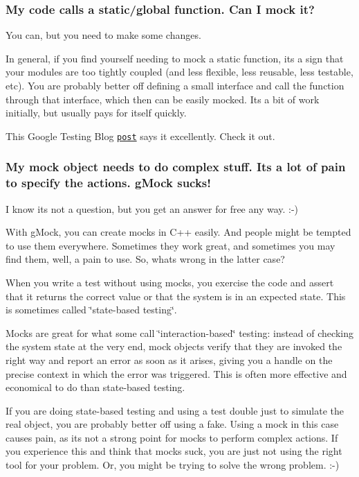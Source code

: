 \subsubsection*{My code calls a static/global function. Can I mock it?}

You can, but you need to make some changes.

In general, if you find yourself needing to mock a static function, it\textquotesingle{}s a sign that your modules are too tightly coupled (and less flexible, less reusable, less testable, etc). You are probably better off defining a small interface and call the function through that interface, which then can be easily mocked. It\textquotesingle{}s a bit of work initially, but usually pays for itself quickly.

This Google Testing Blog \href{https://testing.googleblog.com/2008/06/defeat-static-cling.html}{\tt post} says it excellently. Check it out.

\subsubsection*{My mock object needs to do complex stuff. It\textquotesingle{}s a lot of pain to specify the actions. g\+Mock sucks!}

I know it\textquotesingle{}s not a question, but you get an answer for free any way. \+:-\/)

With g\+Mock, you can create mocks in C++ easily. And people might be tempted to use them everywhere. Sometimes they work great, and sometimes you may find them, well, a pain to use. So, what\textquotesingle{}s wrong in the latter case?

When you write a test without using mocks, you exercise the code and assert that it returns the correct value or that the system is in an expected state. This is sometimes called \char`\"{}state-\/based testing\char`\"{}.

Mocks are great for what some call \char`\"{}interaction-\/based\char`\"{} testing\+: instead of checking the system state at the very end, mock objects verify that they are invoked the right way and report an error as soon as it arises, giving you a handle on the precise context in which the error was triggered. This is often more effective and economical to do than state-\/based testing.

If you are doing state-\/based testing and using a test double just to simulate the real object, you are probably better off using a fake. Using a mock in this case causes pain, as it\textquotesingle{}s not a strong point for mocks to perform complex actions. If you experience this and think that mocks suck, you are just not using the right tool for your problem. Or, you might be trying to solve the wrong problem. \+:-\/)


